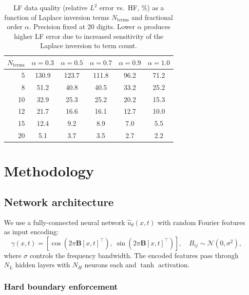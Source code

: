 \documentclass[preprint,12pt]{elsarticle}
\begin{document}
\begin{table}[t]
\centering
\caption{LF data quality (relative $L^2$ error vs.\ HF, \%) as a function of Laplace inversion terms $N_{\mathrm{terms}}$ and fractional order $\alpha$. Precision fixed at 20 digits. Lower $\alpha$ produces higher LF error due to increased sensitivity of the Laplace inversion to term count.}
\label{tab:lf_quality}
\begin{tabular}{rccccc}
\toprule
$N_{\mathrm{terms}}$ & $\alpha = 0.3$ & $\alpha = 0.5$ & $\alpha = 0.7$ & $\alpha = 0.9$ & $\alpha = 1.0$ \\
\midrule
5 & 130.9 & 123.7 & 111.8 & 96.2 & 71.2 \\
8 & 51.2 & 40.8 & 40.5 & 33.2 & 25.2 \\
10 & 32.9 & 25.3 & 25.2 & 20.2 & 15.3 \\
12 & 21.7 & 16.6 & 16.1 & 12.7 & 10.0 \\
15 & 12.4 & 9.2 & 8.9 & 7.0 & 5.5 \\
20 & 5.1 & 3.7 & 3.5 & 2.7 & 2.2 \\
\bottomrule
\end{tabular}
\end{table}

\section{Methodology}
\label{sec:method}

\subsection{Network architecture}

We use a fully-connected neural network $\hat{u}_\theta(x, t)$ with random Fourier features \cite{tancik2020fourier,wang2021eigenvector} as input encoding:
\begin{equation}
\gamma(x, t) = \left[\cos(2\pi \bm{B} [x, t]^\top),\; \sin(2\pi \bm{B} [x, t]^\top)\right], \quad B_{ij} \sim \mathcal{N}(0, \sigma^2),
\end{equation}
where $\sigma$ controls the frequency bandwidth. The encoded features pass through $N_L$ hidden layers with $N_H$ neurons each and $\tanh$ activation.

\subsubsection{Hard boundary enforcement}
\end{document}
